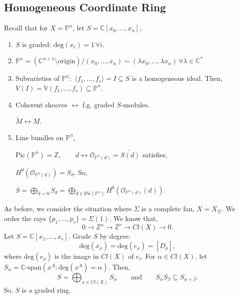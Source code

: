 \documentclass[a4paper,12pt]{amsart}
\begin{document}
\subsection{Homogeneous Coordinate Ring}

Recall that for $X=\mathbb{P}^n$, let $S = \mathbb{C}[x_0,\dotsc,x_n]$,
\begin{enumerate}
	\item $S$ is graded: $\text{deg}(x_i)=1\,\forall i$.
	\item $\mathbb{P}^n = (\mathbb{C}^{n+1} \setminus \text{origin})/(x_0,\dotsc,x_n)\sim (\lambda x_0,\dotsc,\lambda x_n)\,\forall \lambda \in \mathbb{C}^*$
	\item Subvarieties of $\mathbb{P}^n:$ $\langle f_1,\dotsc,f_s \rangle = I \subseteq S$ is a homogeneous ideal. Then, $V(I)=\mathbb{V}(f_1,\dotsc,f_s) \subseteq \mathbb{P}^n$.
	\item Coherent sheaves $\leftrightarrow$ f.g. graded $S$-modules.
	
	$\tilde{M} \leftrightarrow M$.
	\item Line bundles on $\mathbb{P}^n$,
	
	$\text{Pic} (\mathbb{P}^n) = \mathbb{Z}, \qquad d \leftrightarrow \mathcal{O}_{\mathbb{P}^n(d)}=\tilde{S(d)}$
	satisfies,
	
	$H^0(\mathcal{O}_{\mathbb{P}^n(d)})=S_d$.
	So,
	
	$S = \displaystyle \bigoplus_{d=0} S_d = \bigoplus_{d \in \text{Pic}(\mathbb{P}^n)}H^0(\mathcal{O}_{\mathbb{P}^n(d)}(d))$.
\end{enumerate}
As before, we consider the situation where $\Sigma$ is a complete fan, $X=X_\Sigma$. We order the rays $\{ p_1,\dotsc,p_r \}=\Sigma(1)$. We know that,
\begin{equation}
	0 \rightarrow \mathbb{Z}^n \rightarrow \mathbb{Z}^r \rightarrow Cl(X) \rightarrow 0.
\end{equation}
Let $S=\mathbb{C}[x_1,\dotsc,x_r]$. Grade $S$ by degree:
\begin{equation}
	\text{deg}(x_\rho) = \text{deg}(e_\rho) = [D_\rho],
\end{equation}
where $\text{deg}(e_\rho)$ is the image in $Cl(X)$ of $e_i$. For $\alpha \in Cl(X)$, let $S_\alpha = \mathbb{C}\text{-span}(x^A:\text{deg}(x^A)=\alpha)$. Then,
\begin{equation}
	S = \displaystyle \bigoplus_{x \in Cl(X)}S_\alpha \qquad \text{and} \qquad S_\alpha S_\beta \subseteq S_{\alpha + \beta}.
\end{equation}
So, $S$ is a graded ring.
\end{document}
